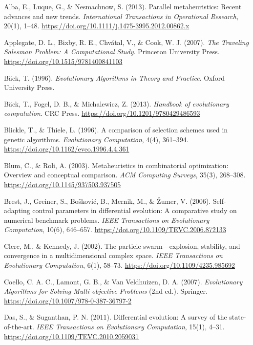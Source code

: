 \documentclass[10pt,a4paper]{article}
\begin{document}
\begin{thebibliography}{99}

Alba, E., Luque, G., \& Nesmachnow, S. (2013). Parallel metaheuristics: Recent advances and new trends. \textit{International Transactions in Operational Research}, 20(1), 1–48. \url{https://doi.org/10.1111/j.1475-3995.2012.00862.x}

Applegate, D. L., Bixby, R. E., Chvátal, V., \& Cook, W. J. (2007). \textit{The Traveling Salesman Problem: A Computational Study}. Princeton University Press. \url{https://doi.org/10.1515/9781400841103}

Bäck, T. (1996). \textit{Evolutionary Algorithms in Theory and Practice}. Oxford University Press.

Bäck, T., Fogel, D. B., \& Michalewicz, Z. (2013). \textit{Handbook of evolutionary computation}. CRC Press. \url{https://doi.org/10.1201/9780429486593}

Blickle, T., \& Thiele, L. (1996). A comparison of selection schemes used in genetic algorithms. \textit{Evolutionary Computation}, 4(4), 361–394. \url{https://doi.org/10.1162/evco.1996.4.4.361}

Blum, C., \& Roli, A. (2003). Metaheuristics in combinatorial optimization: Overview and conceptual comparison. \textit{ACM Computing Surveys}, 35(3), 268–308. \url{https://doi.org/10.1145/937503.937505}

Brest, J., Greiner, S., Bošković, B., Mernik, M., \& Žumer, V. (2006). Self-adapting control parameters in differential evolution: A comparative study on numerical benchmark problems. \textit{IEEE Transactions on Evolutionary Computation}, 10(6), 646–657. \url{https://doi.org/10.1109/TEVC.2006.872133}

Clerc, M., \& Kennedy, J. (2002). The particle swarm—explosion, stability, and convergence in a multidimensional complex space. \textit{IEEE Transactions on Evolutionary Computation}, 6(1), 58–73. \url{https://doi.org/10.1109/4235.985692}

Coello, C. A. C., Lamont, G. B., \& Van Veldhuizen, D. A. (2007). \textit{Evolutionary Algorithms for Solving Multi-objective Problems} (2nd ed.). Springer. \url{https://doi.org/10.1007/978-0-387-36797-2}

Das, S., \& Suganthan, P. N. (2011). Differential evolution: A survey of the state-of-the-art. \textit{IEEE Transactions on Evolutionary Computation}, 15(1), 4–31. \url{https://doi.org/10.1109/TEVC.2010.2059031}


\end{thebibliography}
\end{document}
